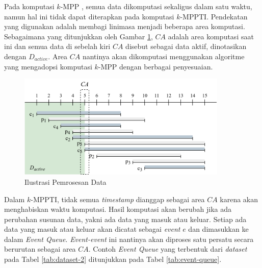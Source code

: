 Pada komputasi $k$-MPP \cite{kmpp}, semua data dikomputasi sekaligus dalam satu waktu, namun hal ini tidak dapat diterapkan pada komputasi $k$-MPPTI. Pendekatan yang digunakan adalah membagi linimasa menjadi beberapa area komputasi. Sebagaimana yang ditunjukkan oleh Gambar \ref{fig:timeline-color}, $CA$ adalah area komputasi saat ini dan semua data di sebelah kiri $CA$ disebut sebagai data aktif, dinotasikan dengan $D_{active}$. Area $CA$ nantinya akan dikomputasi menggunakan algoritme yang mengadopsi komputasi $k$-MPP \cite{kmpp} dengan berbagai penyesuaian.
 
\begin{figure}[H]
	\centering
	\includegraphics[width=10cm]{bab3/img/timeline-color.png}
	\caption{Ilustrasi Pemrosesan Data}
	\label{fig:timeline-color}
\end{figure}

Dalam $k$-MPPTI, tidak semua \textit{timestamp} dianggap sebagai area $CA$ karena akan menghabiskan waktu komputasi. Hasil komputasi akan berubah jika ada perubahan susunan data, yakni ada data yang masuk atau keluar. Setiap ada data yang masuk atau keluar akan dicatat sebagai \textit{event} $e$ dan dimasukkan ke dalam \textit{Event Queue}. \textit{Event-event} ini nantinya akan diproses satu persatu secara berurutan sebagai area $CA$. Contoh \textit{Event Queue} yang terbentuk dari \textit{dataset} pada Tabel \ref{tab:dataset-2} ditunjukkan pada Tabel \ref{tab:event-queue}.

